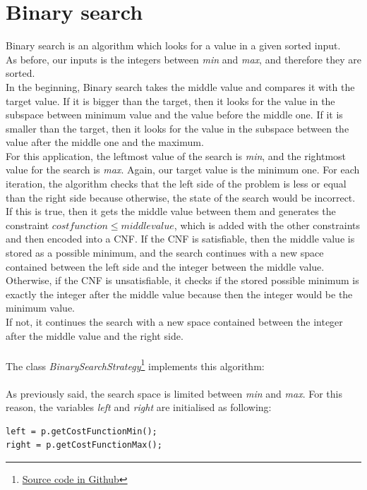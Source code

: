\section{Binary search}
Binary search is an algorithm which looks for a value in a given sorted input.\\
As before, our inputs is the integers between \emph{min} and \emph{max}, and therefore they are sorted.\\
In the beginning, Binary search takes the middle value and compares it with the target value. If it is bigger than the target, then it looks for the value in the subspace between minimum value and the value before the middle one. If it is smaller than the target, then it looks for the value in the subspace between the value after the middle one and the maximum.\\
For this application, the leftmost value of the search is \emph{min}, and the rightmost value for the search is \emph{max}. Again, our target value is the minimum one. For each iteration, the algorithm checks that the left side of the problem is less or equal than the right side because otherwise, the state of the search would be incorrect. \\
If this is true, then it gets the middle value between them and generates the constraint $cost function \leq middle value$, which is added with the other constraints and then encoded into a CNF. If the CNF is satisfiable, then the middle value is stored as a possible minimum, and the search continues with a new space contained between the left side and the integer between the middle value. Otherwise, if the CNF is unsatisfiable, it checks if the stored possible minimum is exactly the integer after the middle value because then the integer would be the minimum value.\\
If not, it continues the search with a new space contained between the integer after the middle value and the right side.\\\\
The class \emph{BinarySearchStrategy}\footnote{\href{https://github.com/marcbenedi/SAT-tfg/blob/master/source_files/BinarySearchStrategy.cpp}{Source code in Github}} implements this algorithm:\\\\
As previously said, the search space is limited between \emph{min} and \emph{max}. For this reason, the variables \emph{left} and \emph{right} are initialised as following:
\begin{verbatim}
left = p.getCostFunctionMin();
right = p.getCostFunctionMax();
\end{verbatim}

